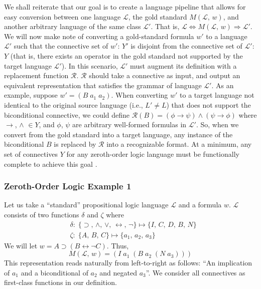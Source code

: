 \documentclass[ms]{uncgdissertationexp2}
\theoremstyle{plain}
\theoremstyle{definition}
\theoremstyle{remark}
\begin{document}
We shall reiterate that our goal is to create a language pipeline that allows for easy conversion between one language $\mathcal{L}$, the gold standard $M(\mathcal{L},\, w)$, and another arbitrary language of the same class $\mathcal{L}'$. That is, $\mathcal{L} \Leftrightarrow M(\mathcal{L},\,w) \Rightarrow \mathcal{L'}$. We will now make note of converting a gold-standard formula $w'$ to a language $\mathcal{L'}$ such that the connective set of $w'$: $Y'$ is disjoint from the connective set of $\mathcal{L}'$: $Y$ (that is, there exists an operator in the gold standard not supported by the target language $\mathcal{L}'$). In this scenario, $\mathcal{L}'$ must augment its definition with a replacement function $\mathcal{R}$. $\mathcal{R}$ should take a connective as input, and output an equivalent representation that satisfies the grammar of language $\mathcal{L}'$. As an example, suppose $w' = (B\;a_1\;a_2)$. When converting $w'$ to a target language not identical to the original source language (i.e., $L' \neq L$) that does not support the biconditional connective, we could define $\mathcal{R}(B) = (\phi \to \psi) \land (\psi \to \phi)$ where $\to$, $\land$ $\in Y$, and $\phi$, $\psi$ are arbitrary well-formed formulas in $\mathcal{L}'$. So, when we convert from the gold standard into a target language, any instance of the biconditional $B$ is replaced by $\mathcal{R}$ into a recognizable format. At a minimum, any set of connectives $Y$ for any zeroth-order logic language must be functionally complete to achieve this goal \cite{post}.

\subsubsection{Zeroth-Order Logic Example 1} Let us take a ``standard'' propositional logic language $\mathcal{L}$ and a formula $w$. $\mathcal{L}$ consists of two functions $\delta$ and $\zeta$ where
\begin{align*}
	  & \delta:\;\{\supset,\,\land,\,\lor,\,\leftrightarrow,\,\lnot\}\mapsto \{I,\,C,\,D,\,B,\,N\} \\
	  & \zeta:\;\{A,\,B,\,C\} \mapsto \{a_{1},\,a_{2},\,a_{3}\}                                   
\end{align*}
We will let $w = A \supset (B \leftrightarrow \lnot C)$. Thus, 
\[
	M(\mathcal{L},\,w) = (I\;a_{1}\;(B\;a_{2}\;(N\;a_{3})))
\]
This representation reads naturally from left-to-right as follows: ``An implication of $a_1$ and a biconditional of $a_2$ and negated $a_3$''. We consider all connectives as first-class functions in our definition.
\end{document}
